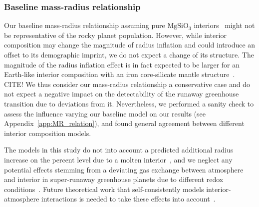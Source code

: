 \documentclass[twocolumn,twocolappendix]{aastex631}
\begin{document}
\subsubsection{Baseline mass-radius relationship}
Our baseline mass-radius relationship assuming pure $\mathrm{MgSiO_3}$ interiors~\citep{Zeng2016} might not be representative of the rocky planet population.
However, while interior composition may change the magnitude of radius inflation and could introduce an offset to its demographic imprint, we do not expect a change of its structure.
The magnitude of the radius inflation effect is in fact expected to be larger for an Earth-like interior composition with an iron core-silicate mantle structure~\citep[][, add Noack+ paper]{Zeng2016,2021JGRE..12606724B}. CITE!
We thus consider our mass-radius relationship a conservative case and do not expect a negative impact on the detectability of the runaway greenhouse transition due to deviations from it.
Nevertheless, we performed a sanity check to assess the influence varying our baseline model on our results (see Appendix~\ref{app:MR_relation}), and found general agreement between different interior composition models.

The models in this study do not into account a predicted additional radius increase on the percent level due to a molten interior~\citep{Bower2019}, and we neglect any potential effects stemming from a deviating gas exchange between atmosphere and interior in super-runaway greenhouse planets due to different redox conditions~\citep{Ikoma2018,2021JGRE..12606711L,2022PSJ.....3...93B,2021SSRv..217...22G}.
Future theoretical work that self-consistently models interior-atmosphere interactions is needed to take these effects into account~\citep{2022arXiv220310023L,Wordsworth2022}.
\end{document}
